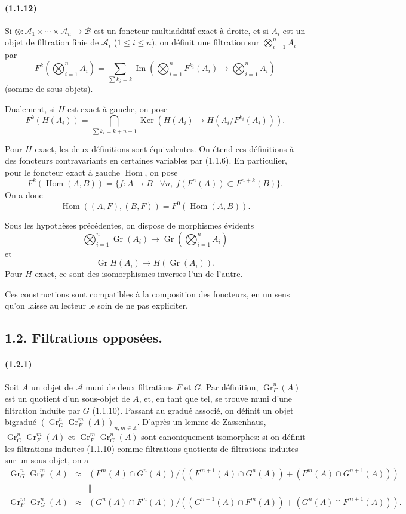 \documentclass[10pt]{article}
\newcommand{\Z}{\mathbb Z}
\newcommand{\Gr}{\operatorname{Gr}}
\newcommand{\Ker}{\operatorname{Ker}}
\newcommand{\Imop}{\operatorname{Im}}
\newcommand{\Hom}{\operatorname{Hom}}
\newcommand{\calA}{\mathcal A}
\newcommand{\calB}{\mathcal B}
\begin{document}
\paragraph{(1.1.12)} Si $\otimes:\calA_1\times\cdots\times\calA_n\to\calB$ est un foncteur multiadditif exact à droite, et si $A_i$ est un objet de filtration finie de $\calA_i$ ($1\le i\le n$), on définit une filtration sur $\bigotimes_{i=1}^nA_i$ par
\[
F^k\left(\bigotimes_{i=1}^n A_i\right)=\sum_{\sum k_i=k}\Imop\left(\bigotimes_{i=1}^n F^{k_i}(A_i)\to\bigotimes_{i=1}^n A_i\right)
\]
(somme de sous-objets).

Dualement, si $H$ est exact à gauche, on pose
\[
F^k(H(A_i))=\bigcap_{\sum k_i=k+n-1}\Ker\left(H(A_i)\to H(A_i/F^{k_i}(A_i))\right).
\]

Pour $H$ exact, les deux définitions sont équivalentes. On étend ces définitions à des foncteurs contravariants en certaines variables par (1.1.6). En particulier, pour le foncteur exact à gauche $\Hom$, on pose
\[
F^k(\Hom(A,B))=\{f:A\to B\mid \forall n,\ f(F^n(A))\subset F^{n+k}(B)\}.
\]
On a donc
\[
\Hom((A,F),(B,F))=F^0(\Hom(A,B)).
\]

Sous les hypothèses précédentes, on dispose de morphismes évidents
\[
\bigotimes_{i=1}^n\Gr(A_i)\to \Gr\left(\bigotimes_{i=1}^nA_i\right)
\]
et
\[
\Gr H(A_i)\to H(\Gr(A_i)).
\]
Pour $H$ exact, ce sont des isomorphismes inverses l'un de l'autre.

Ces constructions sont compatibles à la composition des foncteurs, en un sens qu'on laisse au lecteur le soin de ne pas expliciter.

\subsection*{1.2. Filtrations opposées.}

\paragraph{(1.2.1)} Soit $A$ un objet de $\calA$ muni de deux filtrations $F$ et $G$. Par définition, $\Gr_F^n(A)$ est un quotient d'un sous-objet de $A$, et, en tant que tel, se trouve muni d'une filtration induite par $G$ (1.1.10). Passant au gradué associé, on définit un objet bigradué $(\Gr_G^n\Gr_F^m(A))_{n,m\in\Z}$. D'après un lemme de Zassenhaus, $\Gr_G^n\Gr_F^m(A)$ et $\Gr_F^m\Gr_G^n(A)$ sont canoniquement isomorphes: si on définit les filtrations induites (1.1.10) comme filtrations quotients de filtrations induites sur un sous-objet, on a
\[
\begin{array}{rcc}
\Gr_G^n\Gr_F^m(A)&\approx&
(F^m(A)\cap G^n(A))/((F^{m+1}(A)\cap G^n(A))+(F^m(A)\cap G^{n+1}(A)))\\
&&\Big\Vert\\
\Gr_F^m\Gr_G^n(A)&\approx&
(G^n(A)\cap F^m(A))/((G^{n+1}(A)\cap F^m(A))+(G^n(A)\cap F^{m+1}(A))).
\end{array}
\]
\end{document}
